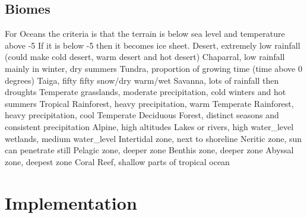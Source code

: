 \documentclass[11pt]{article}
\begin{document}
    \subsection{Biomes}
    For Oceans the criteria is that the terrain is below sea level and temperature above -5
    If it is below -5 then it becomes ice sheet.
    Desert, extremely low rainfall (could make cold desert, warm desert and hot desert)
    Chaparral, low rainfall mainly in winter, dry summers
    Tundra, proportion of growing time (time above 0 degrees)
    Taiga, fifty fifty snow/dry warm/wet
    Savanna, lots of rainfall then droughts
    Temperate grasslands, moderate precipitation, cold winters and hot summers
    Tropical Rainforest, heavy precipitation, warm
    Temperate Rainforest, heavy precipitation, cool
    Temperate Deciduous Forest, distinct seasons and consistent precipitation
    Alpine, high altitudes
    Lakes or rivers, high water_level
    wetlands, medium water_level
    Intertidal zone, next to shoreline
    Neritic zone, sun can penetrate still
    Pelagic zone, deeper zone
    Benthis zone, deeper zone
    Abyssal zone, deepest zone
    Coral Reef, shallow parts of tropical ocean
    

    \section{Implementation}\label{sec:implementation}
\end{document}
